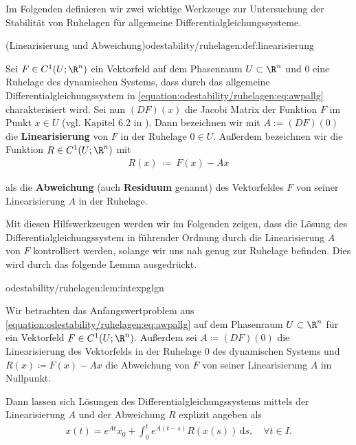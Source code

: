 \documentclass[letterpaper,10pt,german]{jupyterBook}
\begin{document}
\par
Im Folgenden definieren wir zwei wichtige Werkzeuge zur Untersuchung der Stabilität von Ruhelagen für allgemeine Differentialgleichungssysteme.
\begin{definition}{(Linearisierung und Abweichung)}{odestability/ruhelagen:def:linearisierung}



\par
Sei \(F\in C^1(U;\R^n)\) ein Vektorfeld auf dem Phasenraum \(U \subset \R^n\) und \(0\) eine Ruhelage des dynamischen Systems, dass durch das allgemeine Differentialgleichungssystem in \eqref{equation:odestability/ruhelagen:eq:awpallg} charakterisiert wird.
Sei nun \((DF)(x)\) die Jacobi Matrix der Funktion \(F\) im Punkt \(x \in U\) (vgl. Kapitel 6.2 in \cite{Ten21}).
Dann bezeichnen wir mit \(A := (DF)(0)\) die \textbf{Linearisierung} von \(F\) in der Ruhelage \(0 \in U\).
Außerdem bezeichnen wir die Funktion \(R \in C^1(U; \R^n)\) mit
\begin{align*}
R(x) \ \coloneqq \ F(x) - Ax
\end{align*}
\par
als die \textbf{Abweichung} (auch \textbf{Residuum} genannt) des Vektorfeldes \(F\) von seiner Linearisierung \(A\) in der Ruhelage.
\end{definition}

\par
Mit diesen Hilfswerkzeugen werden wir im Folgenden zeigen, dass die Lösung des Differentialgleichungssystem in führender Ordnung durch die Linearisierung \(A\) von \(F\) kontrolliert werden, solange wir uns nah genug zur Ruhelage befinden. Dies wird durch das folgende Lemma ausgedrückt.
\begin{lemma}{}{odestability/ruhelagen:lem:intexpglgn}



\par
Wir betrachten das Anfangswertproblem aus \eqref{equation:odestability/ruhelagen:eq:awpallg} auf dem Phasenraum \(U \subset \R^n\) für ein Vektorfeld \(F\in C^1(U;\R^n)\).
Außerdem sei \(A \coloneqq (DF)(0)\) die Linearisierung des Vektorfelds in der Ruhelage \(0\) des dynamischen Systems und \(R(x) \coloneqq F(x) - Ax\) die Abweichung von \(F\) von seiner Linearisierung \(A\) im Nullpunkt.

\par
Dann lassen sich Lösungen des Differentialgleichungssystems mittels der Linearisierung \(A\) und der Abweichung \(R\) explizit angeben als
\begin{align*}
x(t) = e^{At}x_0 + \int_0^t e^{A(t-s)} R(x(s))\, \mathrm{d}s, \quad \forall t \in I.
\end{align*}\end{lemma}
\end{document}

